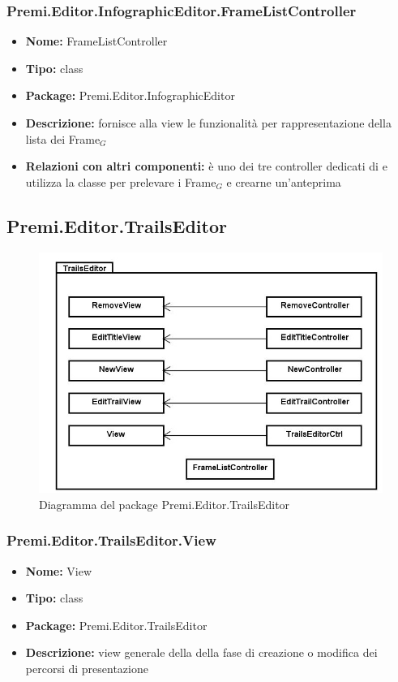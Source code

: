 \subsubsection{Premi.Editor.InfographicEditor.FrameListController}
\begin{itemize}
  \item \textbf{Nome:} FrameListController
  \item \textbf{Tipo:} class
  \item \textbf{Package:} Premi.Editor.InfographicEditor
  \item \textbf{Descrizione:} fornisce alla view  le funzionalità per rappresentazione della lista dei Frame$_G$
  \item \textbf{Relazioni con altri componenti:} è uno dei tre controller dedicati di    e utilizza la classe  per prelevare i Frame$_G$ e crearne un'anteprima
\end{itemize}



\clearpage
\subsection{Premi.Editor.TrailsEditor}
\begin{figure}[h!]
\begin{center}
\includegraphics[scale=0.45]{img/diapkg/trailseditor-class.jpg}
\caption{Diagramma del package Premi.Editor.TrailsEditor}
\end{center}
\end{figure}
\subsubsection{Premi.Editor.TrailsEditor.View}
\begin{itemize}
  \item \textbf{Nome:} View
  \item \textbf{Tipo:} class
  \item \textbf{Package:} Premi.Editor.TrailsEditor
  \item \textbf{Descrizione:} view generale della della fase di creazione o modifica dei percorsi di presentazione
\end{itemize}
